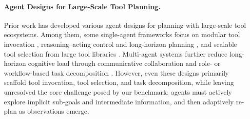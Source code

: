 \paragraph{Agent Designs for Large-Scale Tool Planning.}




Prior work has developed various agent designs for planning with large-scale tool ecosystems. 
Among them, some single-agent frameworks focus on modular tool invocation \citep{karpas2022mrkl, schick2023toolformer}, reasoning--acting control and long-horizon planning \citep{erdogan2025planact, ReAct, koh2025treesearch}, and scalable tool selection from large tool libraries \citep{AnyTool, ToolGen, AutoTool}. 
Multi-agent systems further reduce long-horizon cognitive load through communicative collaboration \citep{li2023camel, wu2024autogen, chen2024agentverse} and role- or workflow-based task decomposition \citep{hong2024metagpt, chen2025smurfs, ling2025elhplan}. 
However, even these designs primarily scaffold tool invocation, tool selection, and task decomposition, while leaving unresolved the core challenge posed by our benchmark: agents must actively explore implicit sub-goals and intermediate information, and then adaptively re-plan as observations emerge.



